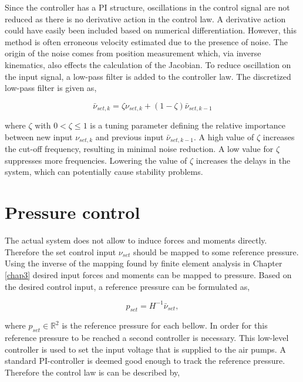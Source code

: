 Since the controller has a PI structure, oscillations in the control signal are not reduced as there is no derivative action in the control law. A derivative action could have easily been included based on numerical differentiation. However, this method is often erroneous velocity estimated due to the presence of noise. The origin of the noise comes from position measurement which, via inverse kinematics, also effects the calculation of the Jacobian. To reduce oscillation on the input signal, a low-pass filter is added to the controller law. The discretized low-pass filter is given as,

\begin{equation}
\bar{\nu}_{set,k} = \zeta \nu_{set,k} + (1-\zeta)\bar{\nu}_{set,k-1}
\label{eq4:lowpass}
\end{equation}

where $\zeta$ with $ 0 < \zeta \leq 1$ is a tuning parameter defining the relative importance between new input $\nu_{set,k}$ and previous input $\bar{\nu}_{set,k-1}$. A high value of $\zeta$ increases the cut-off frequency, resulting in minimal noise reduction. A low value for $\zeta$ suppresses more frequencies. Lowering the value of $\zeta$ increases the delays in the system, which can potentially cause stability problems. 


\section{Pressure control}


The actual system does not allow to induce forces and moments directly. Therefore the set control input $\nu_{set}$ should be mapped to some reference pressure. Using the inverse of the mapping found by finite element analysis in Chapter \ref{chap3} desired input forces and moments can be mapped to pressure. Based on the desired control input, a reference pressure can be formulated as,

\begin{equation}
    p_{set} = H^{-1}\bar{\nu}_{set},
\end{equation}


where $p_{set} \in \mathbb{R}^2$ is the reference pressure for each bellow. In order for this reference pressure to be reached a second controller is necessary. This low-level controller is used to set the input voltage that is supplied to the air pumps. A standard PI-controller is deemed good enough to track the reference pressure. Therefore the control law is can be described by,

